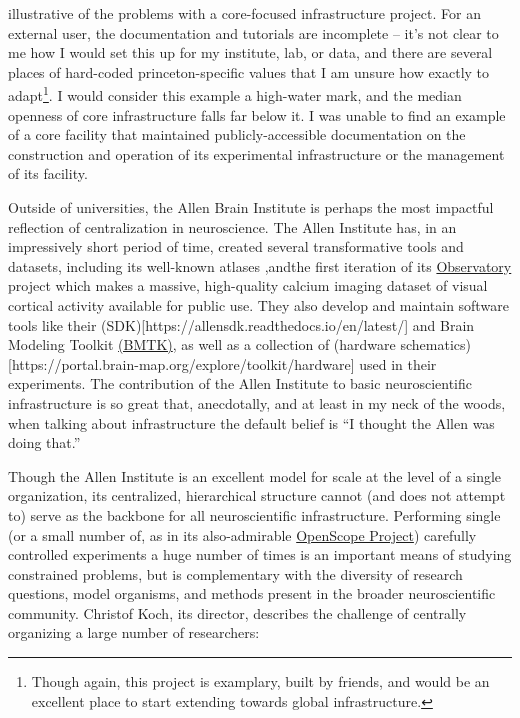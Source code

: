 \documentclass{article}
\begin{document}
illustrative of the problems with a core-focused infrastructure project.
For an external user, the documentation and tutorials are incomplete --
it's not clear to me how I would set this up for my institute, lab, or
data, and there are several places of hard-coded princeton-specific
values that I am unsure how exactly to adapt\footnote{Though again, this
  project is examplary, built by friends, and would be an excellent
  place to start extending towards global infrastructure.}. I would
consider this example a high-water mark, and the median openness of core
infrastructure falls far below it. I was unable to find an example of a
core facility that maintained publicly-accessible documentation on the
construction and operation of its experimental infrastructure or the
management of its facility.

Outside of universities, the Allen Brain Institute is perhaps the most
impactful reflection of centralization in neuroscience. The Allen
Institute has, in an impressively short period of time, created several
transformative tools and datasets, including its well-known atlases \cite{leinGenomewideAtlasGene2007},andthe first iteration of its
\href{http://observatory.brain-map.org/}{Observatory} project which
makes a massive, high-quality calcium imaging dataset of visual cortical
activity available for public use. They also develop and maintain
software tools like their
(SDK){[}https://allensdk.readthedocs.io/en/latest/{]} and Brain Modeling
Toolkit \href{https://alleninstitute.github.io/bmtk/}{(BMTK)}, as well
as a collection of (hardware
schematics){[}https://portal.brain-map.org/explore/toolkit/hardware{]}
used in their experiments. The contribution of the Allen Institute to
basic neuroscientific infrastructure is so great that, anecdotally, and
at least in my neck of the woods, when talking about infrastructure the
default belief is ``I thought the Allen was doing that.''

Though the Allen Institute is an excellent model for scale at the level
of a single organization, its centralized, hierarchical structure cannot
(and does not attempt to) serve as the backbone for all neuroscientific
infrastructure. Performing single (or a small number of, as in its
also-admirable
\href{https://alleninstitute.org/what-we-do/brain-science/news-press/articles/three-collaborative-studies-launch-openscope-shared-observatory-neuroscience}{OpenScope
Project}) carefully controlled experiments a huge number of times is an
important means of studying constrained problems, but is complementary
with the diversity of research questions, model organisms, and methods
present in the broader neuroscientific community. Christof Koch, its
director, describes the challenge of centrally organizing a large number
of researchers:
\end{document}
